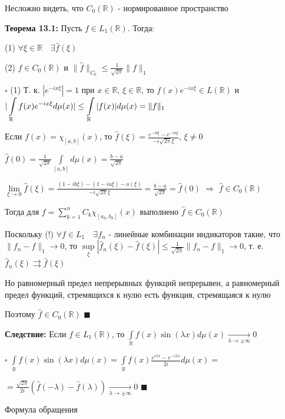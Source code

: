 \documentclass[a4paper]{report}
\newcommand*{\hm}[1]{#1\nobreak\discretionary{}%
            {\hbox{$\mathsurround=0pt #1$}}{}}
\begin{document}
Несложно видеть, что $C_0(\mathbb R)$ - нормированное пространство
\bigskip

\noindent\textbf{Теорема 13.1:} Пусть $f\in L_1(\mathbb R)$. Тогда:

(1) $\forall\xi\in\mathbb R\quad\exists\hat f(\xi)$

(2) $\hat f\in C_0(\mathbb R)$ и $\|\hat f\|_{C_0}\le\frac1{\sqrt{2\pi}}\|f\|_1$

\noindent $\square$ (1) Т. к. $|e^{-ix\xi}|=1$ при $x\in\mathbb R$, $\xi\in\mathbb R$, то $f(x)e^{-ix\xi}\in L(\mathbb R)$ и $|\displaystyle\int\limits_{\mathbb R}f(x)e^{-ix\xi}d\mu(x)|\hm\le\displaystyle\int\limits_{\mathbb R}|f(x)|d\mu(x)=\|f\|_1$

Если $f(x)=\chi_{[a,b]}(x)$, то $\hat f(\xi)=\displaystyle\frac{e^{-ib\xi}-e^{-ia\xi}}{-i\sqrt{2\pi}\xi}$, $\xi\ne0$

$\hat f(0)=\displaystyle\frac1{\sqrt{2\pi}}\displaystyle\int\limits_{[a,b]}d\mu(x)=\frac{b-a}{\sqrt{2\pi}}$

$\lim\limits_{\xi\to0}\hat f(\xi)=\displaystyle\frac{(1-ib\xi)-(1-ia\xi)-o(\xi)}{-i\sqrt{2\pi}\xi}=\frac{b-a}{\sqrt{2\pi}}=\hat f(0)$ $\Rightarrow$ $\hat f\in C_0(\mathbb R)$

Тогда для $f=\sum\limits_{k=1}^n C_k\chi_{[a_k,b_k]}(x)$ выполнено $\hat f\in C_0(\mathbb R)$

Поскольку (!) $\forall f\in L_1\quad\exists f_n$ - линейные комбинации индикаторов такие, что $\|f_n-f\|_1\to0$, то $\sup\limits_\xi|\hat f_n(\xi)-\hat f(\xi)|\le\frac1{\sqrt{2\pi}}\|f_n-f\|_1\to0$, т. е. $\hat f_n(\xi)\rightrightarrows\hat f(\xi)$

Но равномерный предел непрерывных функций непрерывен, а равномерный предел функций, стремящихся к нулю есть функция, стремящаяся к нулю


Поэтому $\hat f\in C_0(\mathbb R)$ $\blacksquare$
\bigskip

\noindent\textbf{Следствие:} Если $f\in L_1(\mathbb R)$, то $\displaystyle\int\limits_{\mathbb R}f(x)\sin(\lambda x)d\mu(x)\xrightarrow[\lambda\to\pm\infty]{}0$

\noindent $\square$ $\displaystyle\int\limits_{\mathbb R}f(x)\sin(\lambda x)d\mu(x)=\displaystyle\int\limits_{\mathbb R}f(x)\frac{e^{i\lambda x}-e^{-i\lambda x}}{2i}d\mu(x)=$

\noindent $=\displaystyle\frac{\sqrt{2\pi}}{2i}\left(\hat f(-\lambda)-\hat f(\lambda)\right)\xrightarrow[\lambda\to\pm\infty]{}0$ $\blacksquare$
\bigskip

\noindent Формула обращения
\end{document}
